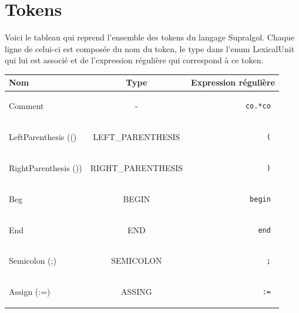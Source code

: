 \documentclass[pdftex,10pt,a4paper]{article}
\begin{document}
\section{Tokens}

Voici le tableau qui reprend l'ensemble des tokens du langage Supralgol. Chaque ligne de celui-ci est composée du nom du token, le type dans l'enum LexicalUnit qui lui est associé et de l'expression régulière qui correspond à ce token.\\

\begin{tabular}{|l|c|r|}
  \hline
  Nom & Type & Expression régulière \\
  \hline
  Comment & - & \begin{minipage}{2in} \begin{verbatim} co.*co \end{verbatim} \end{minipage} \\
  LeftParenthesis (() & LEFT\_PARENTHESIS & \begin{minipage}{2in} \begin{verbatim} ( \end{verbatim} \end{minipage} \\
  RightParenthesis ()) & RIGHT\_PARENTHESIS & \begin{minipage}{2in} \begin{verbatim} ) \end{verbatim} \end{minipage} \\

  Beg & BEGIN & \begin{minipage}{2in} \begin{verbatim} begin \end{verbatim} \end{minipage} \\
  End & END & \begin{minipage}{2in} \begin{verbatim} end \end{verbatim} \end{minipage} \\

  Semicolon (;) & SEMICOLON & \begin{minipage}{2in} \begin{verbatim} ; \end{verbatim} \end{minipage} \\
  Assign (:=) & ASSING & \begin{minipage}{2in} \begin{verbatim} := \end{verbatim} \end{minipage} \\


\end{tabular}
\end{document}
